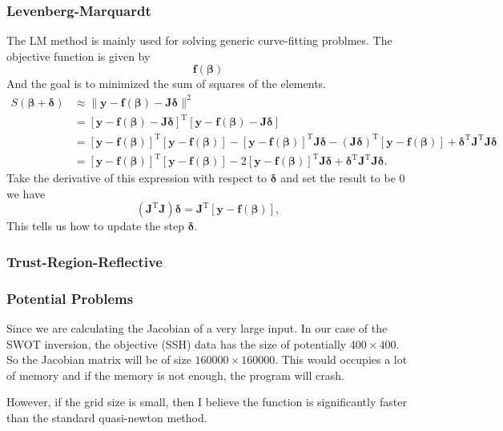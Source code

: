 \documentclass[../SQG_notes.tex]{subfiles}
\begin{document}
\subsubsection{Levenberg-Marquardt}
The LM method is mainly used for solving generic curve-fitting problmes. The objective function is given by 
\[ \bm{f}(\bm{\beta})\]
And the goal is to minimized the sum of squares of the elements. 
\[
\begin{aligned}
S(\boldsymbol{\beta}+\boldsymbol{\delta}) & \approx\|\mathbf{y}-\mathbf{f}(\boldsymbol{\beta})-\mathbf{J} \boldsymbol{\delta}\|^2 \\
& =[\mathbf{y}-\mathbf{f}(\boldsymbol{\beta})-\mathbf{J} \boldsymbol{\delta}]^{\mathrm{T}}[\mathbf{y}-\mathbf{f}(\boldsymbol{\beta})-\mathbf{J} \boldsymbol{\delta}] \\
& =[\mathbf{y}-\mathbf{f}(\boldsymbol{\beta})]^{\mathrm{T}}[\mathbf{y}-\mathbf{f}(\boldsymbol{\beta})]-[\mathbf{y}-\mathbf{f}(\boldsymbol{\beta})]^{\mathrm{T}} \mathbf{J} \boldsymbol{\delta}-(\mathbf{J} \boldsymbol{\delta})^{\mathrm{T}}[\mathbf{y}-\mathbf{f}(\boldsymbol{\beta})]+\boldsymbol{\delta}^{\mathrm{T}} \mathbf{J}^{\mathrm{T}} \mathbf{J} \boldsymbol{\delta} \\
& =[\mathbf{y}-\mathbf{f}(\boldsymbol{\beta})]^{\mathrm{T}}[\mathbf{y}-\mathbf{f}(\boldsymbol{\beta})]-2[\mathbf{y}-\mathbf{f}(\boldsymbol{\beta})]^{\mathrm{T}} \mathbf{J} \boldsymbol{\delta}+\boldsymbol{\delta}^{\mathrm{T}} \mathbf{J}^{\mathrm{T}} \mathbf{J} \boldsymbol{\delta} .
\end{aligned}
\]
Take the derivative of this expression with respect to $\mathbf{\delta}$ and set the result to be 0 we have 
\[
\left(\mathbf{J}^{\mathrm{T}} \mathbf{J}\right) \boldsymbol{\delta}=\mathbf{J}^{\mathrm{T}}[\mathbf{y}-\mathbf{f}(\boldsymbol{\beta})],
\]
This tells us how to update the step $\bm{\delta}$. 
\subsubsection{Trust-Region-Reflective}

\subsubsection{Potential Problems}
Since we are calculating the Jacobian of a very large input. In our case of the SWOT inversion, the objective (SSH) data has the size of potentially $400 \times 400$. So the Jacobian matrix will be of size $160000 \times 160000$. This would occupies a lot of memory and if the memory is not enough, the program will crash. \par
However, if the grid size is small, then I believe the  function is significantly faster than the standard quasi-newton method. 
\end{document}
